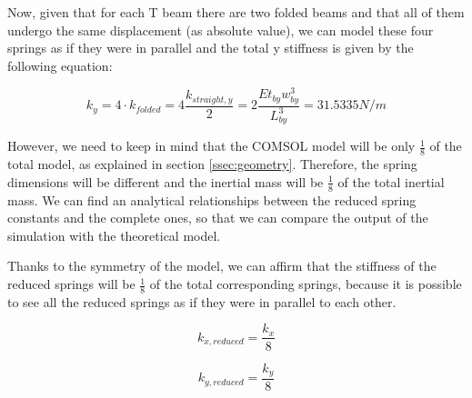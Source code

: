 \documentclass[lettersize,journal]{IEEEtran}
\begin{document}
        Now, given that for each T beam there are two folded beams and that all of them undergo the same displacement (as absolute value), we can model these four springs as if they were in parallel and the total y stiffness is given by the following equation:
        
        \begin{equation}\label{eq:k_y}
            k_y = 4\cdot k_{folded}=4\frac{k_{straight,y}}{2}=2\frac{Et_{by}w^3_{by}}{L^3_{by}}=31.5335N/m
        \end{equation}
        
        However, we need to keep in mind that the COMSOL model will be only \(\frac{1}{8}\) of the total model, as explained in section \ref{ssec:geometry}. Therefore, the spring dimensions will be different and the inertial mass will be \(\frac{1}{8}\)
         of the total inertial mass. We can find an analytical relationships between the reduced spring constants and the complete ones, so that we can compare the output of the simulation with the theoretical model.
         
         Thanks to the symmetry of the model, we can affirm that the stiffness of the reduced springs will be \(\frac{1}{8}\) of the total corresponding springs, because it is possible to see all the reduced springs as if they were in parallel to each other.
         
         \begin{equation}\label{eq:k_x_red}
             k_{x,reduced}=\frac{k_x}{8}
         \end{equation}
         
         \begin{equation}\label{eq:k_y_red}
             k_{y,reduced}=\frac{k_y}{8}
         \end{equation}
         
         
         
         
\end{document}
